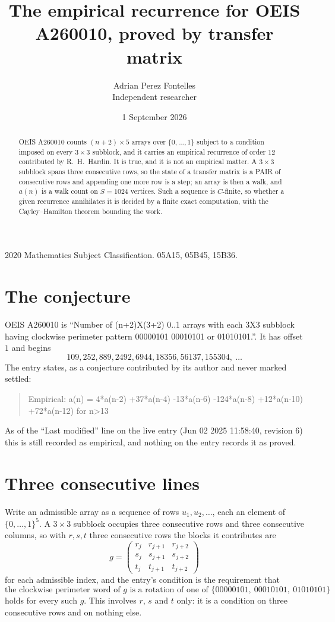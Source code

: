 \documentclass[11pt,a4paper]{article}
\title{The empirical recurrence for OEIS A260010, proved by transfer matrix}
\author{Adrian Perez Fontelles\\ \small Independent researcher}
\date{1 September 2026}
\theoremstyle{plain}
\theoremstyle{definition}
\begin{document}
\maketitle

\begin{abstract}
OEIS A260010 counts $(n+2)\times5$ arrays over $\{0,\dots,1\}$ subject to a condition imposed on
every $3\times3$ subblock, and it carries an empirical recurrence of order $12$
contributed by R.~H.~Hardin. It is true, and it is not an empirical matter. A $3\times3$
subblock spans three consecutive rows, so the state of a transfer matrix is a PAIR of
consecutive rows and appending one more row is a step; an array is then a walk, and
$a(n)$ is a walk count on $S=1024$ vertices. Such a sequence is $C$-finite, so whether a given
recurrence annihilates it is decided by a finite exact computation, with the Cayley--Hamilton
theorem bounding the work.
\end{abstract}

\noindent\small 2020 Mathematics Subject Classification. 05A15, 05B45, 15B36.\normalsize

\section{The conjecture}

OEIS A260010 is ``Number of (n+2)X(3+2) 0..1 arrays with each 3X3 subblock having clockwise perimeter pattern 00000101 00010101 or 01010101.''. It has offset $1$ and begins
\[
109, 252, 889, 2492, 6944, 18356, 56137, 155304,\ \dots
\]
The entry states, as a conjecture contributed by its author and never marked settled:
\begin{quote}
Empirical: a(n) = 4*a(n-2) +37*a(n-4) -13*a(n-6) -124*a(n-8) +12*a(n-10) +72*a(n-12) for n>13
\end{quote}
As of the ``Last modified'' line on the live entry (Jun 02 2025 11:58:40, revision 6) this is still
recorded as empirical, and nothing on the entry records it as proved.

\section{Three consecutive lines}

Write an admissible array as a sequence of rows $u_1,u_2,\dots$, each an element of
$\{0,\dots,1\}^{5}$. A $3\times3$ subblock occupies three consecutive rows and
three consecutive columns, so with $r,s,t$ three consecutive rows the blocks it
contributes are
\[
g=\begin{pmatrix}r_j&r_{j+1}&r_{j+2}\\ s_j&s_{j+1}&s_{j+2}\\ t_j&t_{j+1}&t_{j+2}\end{pmatrix}
\]
for each admissible index, and the entry's condition is the requirement that
\[
\text{the clockwise perimeter word of }g\text{ is a rotation of one of }\{00000101,\ 00010101,\ 01010101\}
\]
holds for every such $g$. This involves $r$, $s$ and $t$ only: it is a condition on
three consecutive rows and on nothing else.
\end{document}
